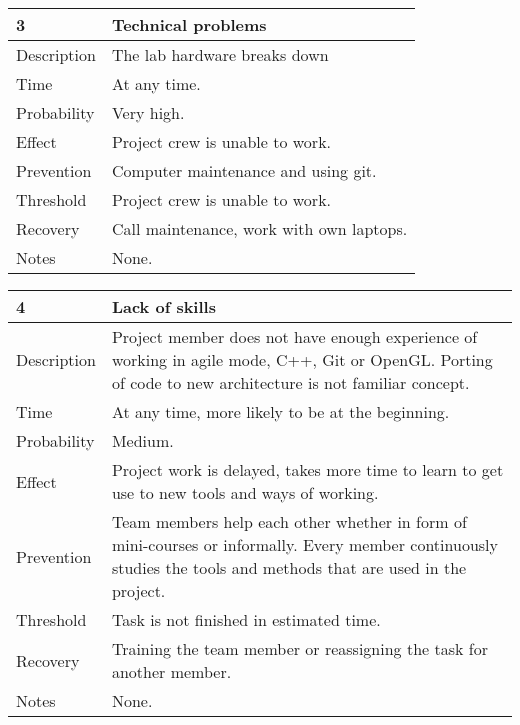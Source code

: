 \documentclass[12pt,titlepage]{article}
\begin{document}
		\begin{center}
		\begin{tabular}{|l|p{10cm}|}
			\hline
			\textbf{3} & \textbf{Technical problems} \\
			\hline
			\hline
			Description & The lab hardware breaks down \\
			\hline
			Time & At any time. \\
			\hline
			Probability & Very high. \\
			\hline
			Effect & Project crew is unable to work. \\
			\hline
			Prevention & Computer maintenance and using git. \\
			\hline
			Threshold & Project crew is unable to work. \\
			\hline
			Recovery & Call maintenance, work with own laptops. \\
			\hline
			Notes & None. \\
			\hline
		\end{tabular}
		\end{center}
		
		\begin{center}
		\begin{tabular}{|l|p{10cm}|}
			\hline
			\textbf{4} & \textbf{Lack of skills} \\
			\hline
			\hline
			Description & Project member does not have enough experience of working in agile mode,  C++, Git or OpenGL.
			Porting of code to new architecture is not familiar concept. \\
			\hline
			Time & At any time, more likely to be at the beginning. \\
			\hline
			Probability & Medium. \\
			\hline
			Effect & Project work is delayed, takes more time to learn to get use to new tools and ways of working. \\
			\hline
			Prevention & Team members help each other whether in form of mini-courses or informally. Every member continuously studies the tools and methods that are used in the project. \\
			\hline
			Threshold & Task is not finished in estimated time. \\
			\hline
			Recovery & Training the team member or reassigning the task for another member. \\
			\hline
			Notes & None. \\
			\hline
		\end{tabular}
		\end{center}
\end{document}

